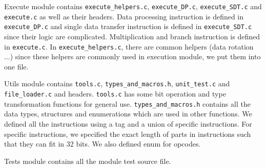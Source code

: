\documentclass[10pt]{article}
\begin{document}
	Execute module contains \texttt{execute\_helpers.c}, \texttt{execute\_DP.c}, \texttt{execute\_SDT.c} and \texttt{execute.c} as well as their headers. Data processing instruction is defined in \texttt{execute\_DP.c} and single data transfer instruction is defined in \texttt{execute\_SDT.c} since their logic are complicated. Multiplication and branch instruction is defined in \texttt{execute.c}. In \texttt{execute\_helpers.c}, there are common helpers (data rotation ...) since these helpers are commonly used in execution module, we put them into one file.
	
	Utils module contains \texttt{tools.c}, \texttt{types\_and\_macros.h}, \texttt{unit\_test.c} and \texttt{file\_loader.c} and headers. \texttt{tools.c} has some bit operation and type transformation functions for general use. \texttt{types\_and\_macros.h} contains all the data types, structures and enumerations which are used in other functions. We defined all the instructions using a tag and a union of specific instructions. For specific instructions, we specified the exact length of parts in instructions such that they can fit in 32 bits. We also defined enum for opcodes.
	
	Tests module contains all the module test source file.
	
\end{document}
